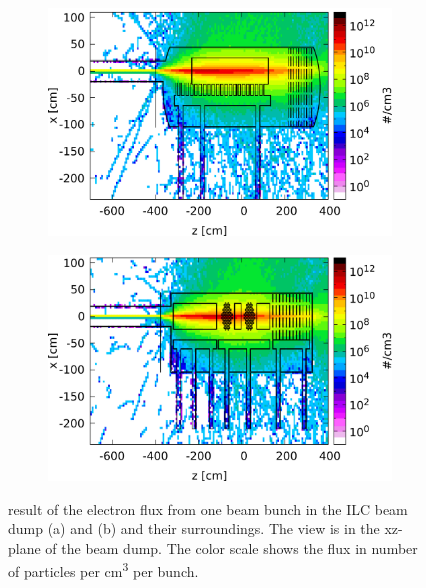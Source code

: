\begin{figure}[!h]
 \centering
  \begin{subfigure}[b]{0.49\textwidth}
   \centering
    \includegraphics[width=\textwidth]{Figures/BeamDump/Electron_flux_xz_Design1.png}
   \caption{\designone}
   \end{subfigure}
   \hfill
    \begin{subfigure}[b]{0.49\textwidth}
   \centering
    \includegraphics[width=\textwidth]{Figures/BeamDump/Electron_flux_xz_Design2.png}
   \caption{\designtwo}
   \end{subfigure}
   \caption[Electron flux in the ILC main beam dump]{\fluka result of the electron flux from one beam bunch in the ILC beam dump \designone (a) and \designtwo (b) and their surroundings.
   The view is in the xz-plane of the beam dump.
   The color scale shows the flux in number of particles per \si[detect-all]{\centi\meter\cubed} per bunch.}
   \label{fig:BeamDumps:Electrons}
\end{figure} 

